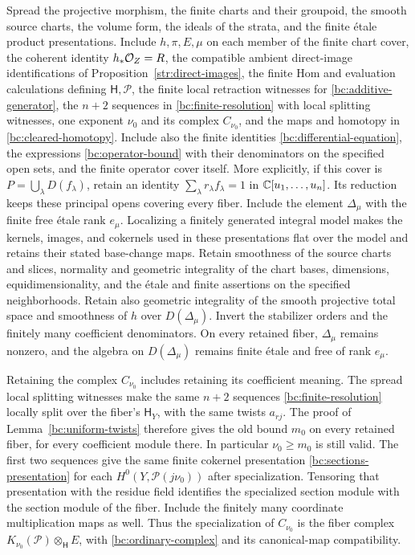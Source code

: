 Spread the projective morphism,
the finite charts and their groupoid, the smooth source charts, the
volume form, the ideals of the strata, and the finite \'{e}tale product
presentations.  Include $h,\pi,E,\mu$ on each member of the finite
chart cover, the coherent identity $h_*\mathcal O_Z=R$, the compatible ambient
direct-image identifications of Proposition~\ref{str:direct-images},
the finite Hom and evaluation calculations defining
$\mathsf H,\mathcal P$, the finite local retraction witnesses for
\eqref{bc:additive-generator}, the $n+2$ sequences in
\eqref{bc:finite-resolution} with local splitting witnesses, one exponent
$\nu_0$ and its complex $C_{\nu_0}$, and the maps and homotopy in
\eqref{bc:cleared-homotopy}.  Include also the finite identities
\eqref{bc:differential-equation}, the expressions
\eqref{bc:operator-bound} with their denominators on the specified open
sets, and the finite operator cover itself.  More explicitly, if this
cover is $P=\bigcup_\lambda D(f_\lambda)$, retain an identity
$\sum_\lambda r_\lambda f_\lambda=1$ in $\mathbb C[u_1,\ldots,u_n]$.
Its reduction keeps these principal opens covering every fiber.
Include the element $\Delta_\mu$ with the finite free \'{e}tale
rank $e_\mu$.  Localizing a finitely generated integral model makes the kernels,
images, and cokernels used in these presentations flat over the model
and retains their stated base-change maps.  Retain smoothness of the
source charts and slices, normality and geometric integrality of the
chart bases, dimensions, equidimensionality, and the \'{e}tale and finite
assertions on the specified neighborhoods.  Retain also geometric
integrality of the smooth projective total space and smoothness of $h$
over $D(\Delta_\mu)$.  Invert the stabilizer
orders and the finitely many coefficient denominators.  On every retained
fiber, $\Delta_\mu$ remains nonzero, and the algebra on
$D(\Delta_\mu)$ remains finite \'{e}tale and free of rank $e_\mu$.

Retaining the complex $C_{\nu_0}$ includes retaining its coefficient
meaning.  The spread local splitting witnesses make the same $n+2$
sequences \eqref{bc:finite-resolution} locally split over the fiber's
$\mathsf H_Y$, with the same twists $a_{rj}$.  The proof of
Lemma~\ref{bc:uniform-twists} therefore gives the old bound $m_0$ on
every retained fiber, for every coefficient module there.  In
particular $\nu_0\ge m_0$ is still valid.  The first two sequences give
the same finite cokernel presentation \eqref{bc:sections-presentation}
for each $H^0(Y,\mathcal P(j\nu_0))$ after specialization.  Tensoring
that presentation with the residue field identifies the specialized
section module with the section module of the fiber.  Include the
finitely many coordinate multiplication maps as well.  Thus the
specialization of $C_{\nu_0}$ is the fiber complex
$K_{\nu_0}(\mathcal P)\otimes_{\mathsf H}E$, with
\eqref{bc:ordinary-complex} and its canonical-map compatibility.

